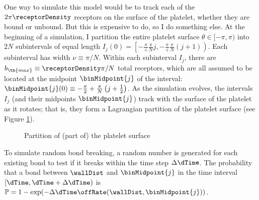 One way to simulate this model would be to track each of the
$2\pi \receptorDensity$ receptors on the surface of the platelet,
whether they are bound or unbound. But this is expensive to do, so I
do something else. At the beginning of a simulation, I partition the
entire platelet surface $\theta \in [-\pi, \pi)$ into $2N$
subintervals of equal length
$I_j(0) = \left[-\frac{\pi} + \frac{\pi}{N}j, -\frac{\pi} +
  \frac{\pi}{N} (j+1)\right)$. Each subinterval has width
$\nu \equiv \pi/N$. Within each subinterval $I_j$, there are
$b_\tn{max} \equiv \receptorDensity \pi/N$ total receptors, which are
all assumed to be located at the midpoint $\binMidpoint{j}$ of the
interval:
$\binMidpoint{j}(0) \equiv -\frac{\pi}{2} + \frac{\pi}{N} \left( j +
  \frac{1}{2} \right)$. As the simulation evolves, the intervals $I_j$
(and their midpoints $\binMidpoint{j}$) track with the surface of the
platelet as it rotates; that is, they form a Lagrangian partition of
the platelet surface (see Figure \ref{fig:plt-bins}).

\begin{figure}
  \centering
  \caption{Partition of (part of) the platelet surface}
  \label{fig:plt-bins}
\end{figure}

To simulate random bond breaking, a random number is generated for
each existing bond to test if it breaks within the time step
$\Delta \dTime$. The probability that a bond between $\wallDist$ and
$\binMidpoint{j}$ in the time interval $[\dTime, \dTime + \Delta \dTime)$
is $\mathbb{P} = 1 - \exp(-\Delta \dTime \offRate(\wallDist,
\binMidpoint{j}))$.

